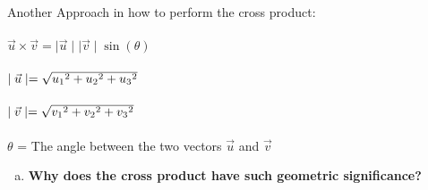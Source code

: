 \documentclass{article}
\begin{document}
\begin{enumerate}[a.]
Another Approach in how to perform the cross product:\\
\\
$\vec{u} \times \vec{v} =  \mid\vec{u}\mid\mid\vec{v}\mid\sin(\theta)$\\
\\
$\mid\vec{u}\mid = \sqrt{u_{1}\hspace{.001cm}^{2}+u_{2}\hspace{.001cm}^{2}+u_{3}\hspace{.001cm}^{2}}$\\
\\
$\mid\vec{v}\mid = \sqrt{v_{1}\hspace{.001cm}^{2}+v_{2}\hspace{.001cm}^{2}+v_{3}\hspace{.001cm}^{2}}$\\
\\
$\theta$ = The angle between the two vectors $\vec{u}$ and $\vec{v}$
\end{enumerate}
\begin{enumerate}[b.]
\item \textbf{Why does the cross product have such geometric significance?}\\
\\
\end{enumerate}
\end{document}
